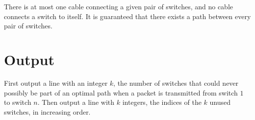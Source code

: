 There is at most one cable connecting a given pair of switches, and no cable
connects a switch to itself. It is guaranteed that there exists a path between
every pair of switches.

\section*{Output}
First output a line with an integer $k$, the number of switches that could never possibly be
part of an optimal path when a packet is transmitted from switch $1$ to switch $n$.
Then output a line with $k$ integers,
the indices of the $k$ unused switches, in increasing order.

